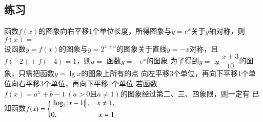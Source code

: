 \documentclass{BHCexam}
\begin{document}
\subsection*{练习}
\begin{questions}
\qs 函数$f(x)$的图象向右平移$ 1 $个单位长度，所得图象与$ y=e^x $关于$ y $轴对称，则$f(x)=$\\\mbox{\hspace{1ex}}\hfill\xx
{}
\qs 设函数$y=f(x)$的图象与$ y=2^{x+a} $的图象关于直线$ y=-x $对称，且$ f(-2)+f(-4)=1 $，则$ a= $\xx
{}
\qs 函数$ y=-e^x $的图象\xx
{}
\qs 为了得到$ y=\lg \dfrac{x+3}{10} $的图象，只需把函数$ y=\lg x $的图象上所有的点\xx
{} {向左平移$ 3 $个单位，再向下平移$ 1 $个单位}{向右平移$ 3 $个单位，再向下平移$ 1 $个单位}
\qs 若函数$ f(x)=a^x+b-1 ~(a>0\text{且}a\ne1)$的图象经过第二、三、四象限，则一定有\xx
{}
\qs 已知函数$f(x)=\Bigg\{\begin{aligned}
&\left| \log_2\left| x-1 \right| \right|,&x\ne1,\\
&0,&x=1
\end{aligned}$
\end{questions}
\newpage
\end{document}
